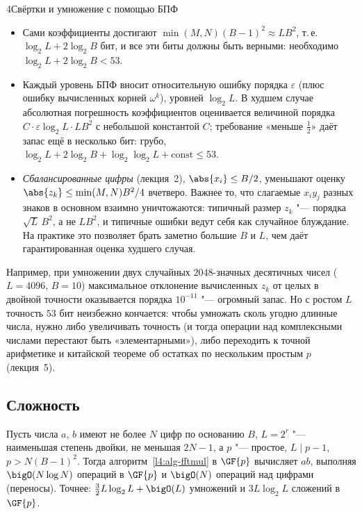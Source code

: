 \begin{lecture}{4}{Свёртки и умножение с помощью БПФ}
\begin{itemize}
  \item Сами коэффициенты достигают $\min(M, N)(B - 1)^2 \approx L B^2$, т.\,е.
    $\log_2 L + 2\log_2 B$ бит, и все эти биты должны быть верными: необходимо
    $\log_2 L + 2\log_2 B < 53$.
  \item Каждый уровень БПФ вносит относительную ошибку порядка $\varepsilon$ (плюс ошибку
    вычисленных корней $\omega^k$), уровней $\log_2 L$. В худшем случае абсолютная погрешность
    коэффициентов оценивается величиной порядка $C \cdot \varepsilon \log_2 L \cdot L B^2$ с небольшой
    константой $C$; требование «меньше $\frac12$» даёт запас ещё в несколько бит:
    грубо, $\log_2 L + 2\log_2 B + \log_2\log_2 L + \text{const} \le 53$.
  \item \emph{Сбалансированные цифры} (лекция~2), $\abs{x_i} \le B/2$, уменьшают оценку
    $\abs{z_k} \le \min(M, N) B^2/4$ вчетверо. Важнее то, что слагаемые $x_i y_j$ разных знаков
    в основном взаимно уничтожаются: типичный размер $z_k$ "--- порядка $\sqrt{L}\, B^2$,
    а не $L B^2$, и типичные ошибки ведут себя как случайное блуждание. На практике это позволяет
    брать заметно большие $B$ и $L$, чем даёт гарантированная оценка худшего случая.
\end{itemize}

Например, при умножении двух случайных $2048$-значных десятичных чисел ($L = 4096$, $B = 10$)
максимальное отклонение вычисленных $z_k$ от целых в двойной точности оказывается порядка
$10^{-11}$ "--- огромный запас. Но с ростом $L$ точность $53$ бит неизбежно кончается: чтобы
умножать сколь угодно длинные числа, нужно либо увеличивать точность (и тогда операции над
комплексными числами перестают быть «элементарными»), либо переходить к точной арифметике
и китайской теореме об остатках по нескольким простым $p$ (лекция~5).


\subsection{Сложность}

\begin{theorem}\label{l4:fftmul}
Пусть числа $a$, $b$ имеют не более $N$ цифр по основанию $B$, $L = 2^r$ "--- наименьшая
степень двойки, не меньшая $2N - 1$, а $p$ "--- простое, $L \mid p - 1$,
$p > N (B - 1)^2$. Тогда алгоритм~\ref{l4:alg-fftmul} в $\GF{p}$ вычисляет $ab$, выполняя
$\bigO(N \log N)$ операций в $\GF{p}$ и $\bigO(N)$ операций над цифрами (переносы).
Точнее: $\frac32 L \log_2 L + \bigO(L)$ умножений и $3 L \log_2 L$ сложений в $\GF{p}$.
\end{theorem}


\end{lecture}

